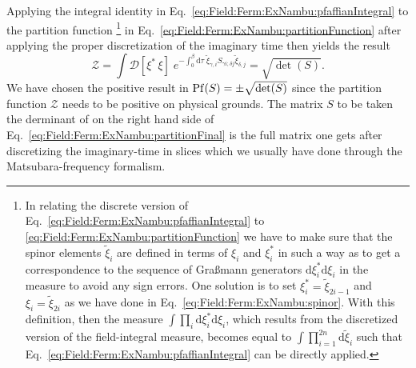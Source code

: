 Applying the integral identity in Eq.~\eqref{eq:Field:Ferm:ExNambu:pfaffianIntegral} to the partition function%
%
\footnote{In relating the discrete version of
Eq.~\eqref{eq:Field:Ferm:ExNambu:pfaffianIntegral} to \eqref{eq:Field:Ferm:ExNambu:partitionFunction} we have to make sure that the spinor elements $\tilde{\xi}_i$
are defined in terms of $\xi_i$ and $\xi_i^\ast$ in such a way as to get a correspondence to the sequence of Gra\ss mann
generators $\mathrm{d}\xi^\ast_i\mathrm{d}\xi_i$ in the measure to avoid any sign errors. One solution
is to set $\xi_i^\ast = \tilde{\xi}_{2i-1}$ and $\xi_i = \tilde{\xi}_{2i}$ as we have done in Eq.~\eqref{eq:Field:Ferm:ExNambu:spinor}. With this definition,
then the measure $\int\prod_i\mathrm{d}\xi_i^\ast\mathrm{d}\xi_i$, which results from the discretized version of the field-integral measure, becomes
equal to $\int\prod_{i=1}^{2n}\mathrm{d}\tilde{\xi}_i$ such that Eq.~\eqref{eq:Field:Ferm:ExNambu:pfaffianIntegral} can be directly applied.%
} %
%
in Eq.~\eqref{eq:Field:Ferm:ExNambu:partitionFunction}
after applying the proper discretization of the imaginary time then yields the result
\begin{equation}
    \label{eq:Field:Ferm:ExNambu:partitionFinal}
    \mathcal{Z} = \int\!\mathcal{D}[\xi^\ast\,\xi]\;e^{-\int_0^\beta\!\mathrm{d}\tau\;\tilde{\xi}_{\gamma,i}S_{\gamma i; \delta j}\tilde{\xi}_{\delta, j}} = \sqrt{\det(S)}.
\end{equation}
We have chosen the positive result in $\operatorname{Pf}(S) = \pm\sqrt{\det(S)}$ since the partition function $\mathcal{Z}$ needs to be positive on physical grounds.
The matrix $S$ to be taken the derminant of on the right hand side of Eq.~\eqref{eq:Field:Ferm:ExNambu:partitionFinal} is the full matrix one gets after
discretizing the imaginary-time in slices which we usually have done through the Matsubara-frequency formalism.

